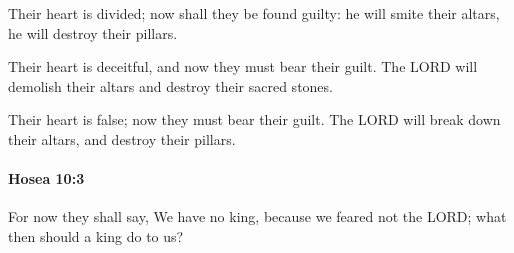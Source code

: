 			\begin{versebox}
					\item[BHS] 
					\item[LXX] 
					\item[ASV] Their heart is divided; now shall they be found guilty: he will smite their altars, he will destroy their pillars.
					\item[NIV] Their heart is deceitful, and now they must bear their guilt. The LORD will demolish their altars and destroy their sacred stones.
					\item[NRSV] Their heart is false; now they must bear their guilt. The LORD will break down their altars, and destroy their pillars.
			\end{versebox}

		\paragraph{Hosea 10:3} %
			\label{HOSEA-10-3}

			For now they shall say, We have no king, because we feared not the LORD; what then should a king do to us?

